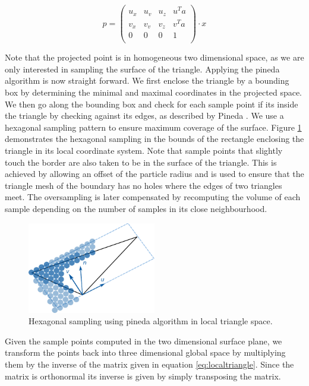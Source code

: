 \documentclass[11pt, letterpaper, twocolumn]{article}
\begin{document}
\begin{equation}
  p = 
  \begin{pmatrix}
    u_x & u_v & u_z & u^T a\\
    v_x & v_v & v_z & v^T a\\
    0 & 0 & 0 & 1 \\
  \end{pmatrix}
  \cdot x 
\label{eq:localtriangle}
\end{equation}

Note that the projected point is in homogeneous two dimensional space, as we are only interested in sampling the surface of the triangle. Applying the pineda algorithm is now straight forward. We first enclose the triangle by a bounding box by determining the minimal and maximal coordinates in the projected space. We then go along the bounding box and check for each sample point if its inside the triangle by checking against its edges, as described by Pineda \cite{pineda1988}. We use a hexagonal sampling pattern to ensure maximum coverage of the surface. Figure \ref{fig:trianglesampling} demonstrates the hexagonal sampling in the bounds of the rectangle enclosing the triangle in its local coordinate system. Note that sample points that slightly touch the border are also taken to be in the surface of the triangle. This is achieved by allowing an offset of the particle radius and is used to ensure that the triangle mesh of the boundary has no holes where the edges of two triangles meet. The oversampling is later compensated by recomputing the volume of each sample depending on the number of samples in its close neighbourhood.

\begin{figure}[ht]
    \centering
    \includegraphics[width=0.5\textwidth]{images/triangle.pdf}
    \caption{Hexagonal sampling using pineda algorithm in local triangle space.}
    \label{fig:trianglesampling}
\end{figure}

Given the sample points computed in the two dimensional surface plane, we transform the points back into three dimensional global space by multiplying them by the inverse of the matrix given in equation \ref{eq:localtriangle}. Since the matrix is orthonormal its inverse is given by simply transposing the matrix.
\end{document}
